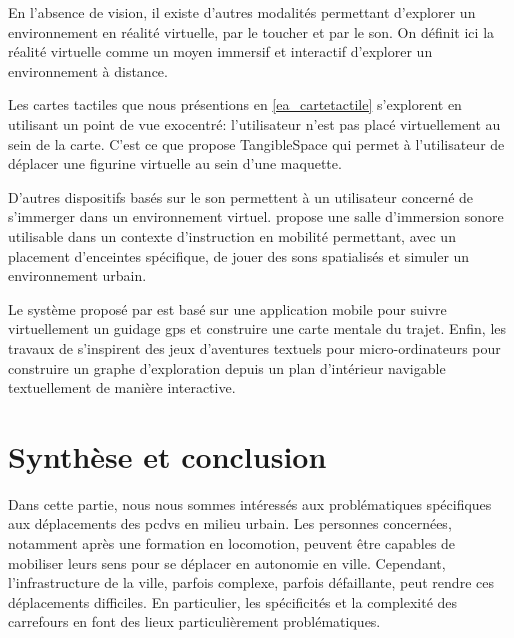 En l'absence de vision, il existe d'autres modalités permettant d'explorer un environnement en réalité virtuelle, par le toucher et par le son. On définit ici la réalité virtuelle comme un  moyen immersif et interactif d'explorer un environnement à distance.

\newpar{}

Les cartes tactiles que nous présentions en \ref{ea_cartetactile} s'explorent en utilisant un point de vue exocentré: l'utilisateur n'est pas placé virtuellement au sein de la carte. C'est ce que propose TangibleSpace \citep{Mulet2020} qui permet à l'utilisateur de déplacer une figurine virtuelle au sein d'une maquette.

\newpar{}

D'autres dispositifs basés sur le son permettent à un utilisateur concerné de s'immerger dans un environnement virtuel. \citet{Thome2021} propose une salle d'immersion sonore utilisable dans un contexte d'instruction en mobilité permettant, avec un placement d'enceintes spécifique, de jouer des sons spatialisés et simuler un environnement urbain. 

\newpar{}

Le système proposé par \citet{Guerreiro2017} est basé sur une application mobile pour suivre virtuellement un guidage \gls{gps} et construire une carte mentale du trajet. Enfin, les travaux de \citet{Arabsheibani2023} s'inspirent des jeux d'aventures textuels pour micro-ordinateurs pour construire un graphe d'exploration depuis un plan d'intérieur navigable textuellement de manière interactive.

\newpage
\section{Synthèse et conclusion}



Dans cette partie, nous nous sommes intéressés aux problématiques spécifiques aux déplacements des \glspl{pcdv} en milieu urbain. Les personnes concernées, notamment après une formation en locomotion, peuvent être capables de mobiliser leurs sens pour se déplacer en autonomie en ville. Cependant, l'infrastructure de la ville, parfois complexe, parfois défaillante, peut rendre ces déplacements difficiles. En particulier, les spécificités et la complexité des carrefours en font des lieux particulièrement problématiques.

